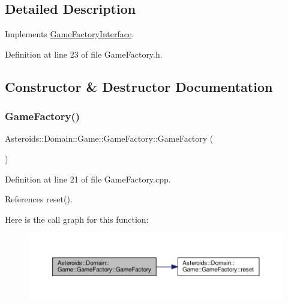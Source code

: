 \subsection{Detailed Description}
Implements \hyperlink{classAsteroids_1_1Domain_1_1Game_1_1GameFactoryInterface}{Game\+Factory\+Interface}. 

Definition at line 23 of file Game\+Factory.\+h.



\subsection{Constructor \& Destructor Documentation}
\mbox{\label{classAsteroids_1_1Domain_1_1Game_1_1GameFactory_a90ae7ac4ed8428b369c71b3dd17a9751}} 
\subsubsection{\texorpdfstring{Game\+Factory()}{GameFactory()}}
{\footnotesize\ttfamily Asteroids\+::\+Domain\+::\+Game\+::\+Game\+Factory\+::\+Game\+Factory (\begin{DoxyParamCaption}{ }\end{DoxyParamCaption})}



Definition at line 21 of file Game\+Factory.\+cpp.



References reset().

Here is the call graph for this function\+:\nopagebreak
\begin{figure}[H]
\begin{center}
\leavevmode
\includegraphics[width=350pt]{classAsteroids_1_1Domain_1_1Game_1_1GameFactory_a90ae7ac4ed8428b369c71b3dd17a9751_cgraph}
\end{center}
\end{figure}



